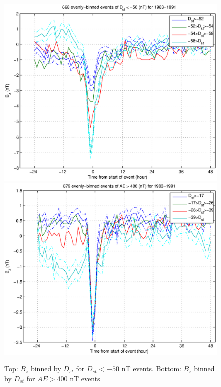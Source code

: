 \documentclass[10pt,twocolumn]{article}
\begin{document}
\begin{figure}[htp!]
\includegraphics[scale=0.45]{paperfigures/HighLowDstBz-Dst50.eps}
\includegraphics[scale=0.45]{paperfigures/HighLowDstBz-AE400.eps}
\caption{Top: $B_z$ binned by $D_{st}$ for $D_{st} < -50$ nT events. Bottom: $B_z$ binned by $D_{st}$ for $AE > 400$ nT events}
\end{figure}
\clearpage
\end{document}
